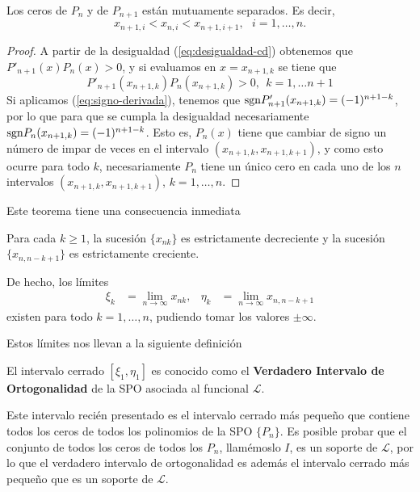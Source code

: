 \begin{teorema}
    Los ceros de $P_n$ y de $P_{n+1}$ están mutuamente separados. Es decir,
    $$
    x_{n+1,i} < x_{n,i} < x_{n+1,i+1}, \ \ \ i=1,\dots, n.
    $$
\end{teorema}
\begin{proof}
    A partir de la desigualdad (\ref{eq:desigualdad-cd}) obtenemos que $P'_{n+1}(x)P_n(x)>0$, y si evaluamos en $x=x_{n+1,k}$ se tiene que
    $$
    P'_{n+1}(x_{n+1,k})P_n(x_{n+1,k})>0, \ \ k=1,\dots n+1
    $$
    Si aplicamos (\ref{eq:signo-derivada}), tenemos que $\mathrm{sgn}  P'_{n+1}(x_{n+1,k}) = (-1)^{n+1-k}$, por lo que para que se cumpla la desigualdad necesariamente $\mathrm{sgn} P_n(x_{n+1,k}) = (-1)^{n+1-k}$.
    Esto es, $P_n(x)$ tiene que cambiar de signo un número de impar de veces en el intervalo $(x_{n+1,k},x_{n+1,k+1})$, y como esto ocurre para todo $k$, necesariamente $P_n$ tiene un único cero en cada uno de los $n$ intervalos $(x_{n+1,k},x_{n+1,k+1})$, $k=1,\dots, n$.
\end{proof}

Este teorema tiene una consecuencia inmediata

\begin{corolario}
    \label{cor:sucesiones-ceros}
    Para cada $k\geq 1$, la sucesión $\{x_{nk}\}$ es estrictamente decreciente y la sucesión $\{x_{n,n-k+1}\}$ es estrictamente creciente. 

    De hecho, los límites
    \begin{align*}
        \xi_k &= \lim_{n\rightarrow\infty} x_{nk}, &  \eta_k &= \lim_{n\rightarrow\infty} x_{n,n-k+1}
    \end{align*}
    existen para todo $k=1,\dots,n$, pudiendo tomar los valores $\pm \infty$.
\end{corolario}

Estos límites nos llevan a la siguiente definición

\begin{definicion}
    El intervalo cerrado $[\xi_1,\eta_1]$ es conocido como el \textbf{Verdadero Intervalo de Ortogonalidad} de la SPO asociada al funcional $\mathcal{L}$.
\end{definicion}

Este intervalo recién presentado es el intervalo cerrado más pequeño que contiene todos los ceros de todos los polinomios de la SPO $\{P_n\}$. Es posible probar que el conjunto de todos los ceros de todos los $P_n$, llamémoslo $I$, es un soporte de $\mathcal{L}$, por lo que el verdadero intervalo de ortogonalidad es además el intervalo cerrado más pequeño que es un soporte de $\mathcal{L}$.

